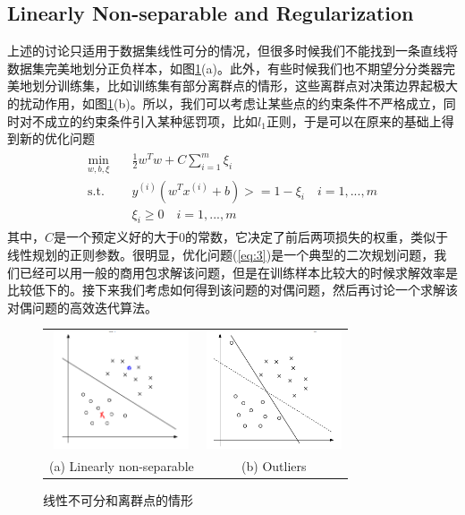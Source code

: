 \documentclass[11pt]{article}
\begin{document}
\subsection{Linearly Non-separable and Regularization}
上述的讨论只适用于数据集线性可分的情况，但很多时候我们不能找到一条直线将数据集完美地划分正负样本，如图\ref{img2}(a)。此外，有些时候我们也不期望分分类器完美地划分训练集，比如训练集有部分离群点的情形，这些离群点对决策边界起极大的扰动作用，如图\ref{img2}(b)。所以，我们可以考虑让某些点的约束条件不严格成立，同时对不成立的约束条件引入某种惩罚项，比如$l_1$正则，于是可以在原来的基础上得到新的优化问题
\begin{align}\label{eq:3}
\begin{split}
\min_{w, b, \xi}\quad&\frac{1}{2}w^Tw +C\sum_{i=1}^m\xi_i\\
\text{s.t.}\quad&y^{(i)}(w^Tx^{(i)}+b)>=1-\xi_i\quad i = 1,...,m\\
&\xi_i\geq 0\quad i=1,...,m
\end{split}
\end{align}
其中，$C$是一个预定义好的大于0的常数，它决定了前后两项损失的权重，类似于线性规划的正则参数。很明显，优化问题(\ref{eq:3})是一个典型的二次规划问题，我们已经可以用一般的商用包求解该问题，但是在训练样本比较大的时候求解效率是比较低下的。接下来我们考虑如何得到该问题的对偶问题，然后再讨论一个求解该对偶问题的高效迭代算法。
\begin{figure}
\centering
\begin{tabular}{cc}
	
	\includegraphics[width=4cm]{images/img6.png}
	& 
	\includegraphics[width=4cm]{images/img7.png} \\
	
	(a) Linearly non-separable & (b) Outliers\\
\end{tabular}
\caption{线性不可分和离群点的情形}
\label{img2}
\end{figure}
\end{document}
